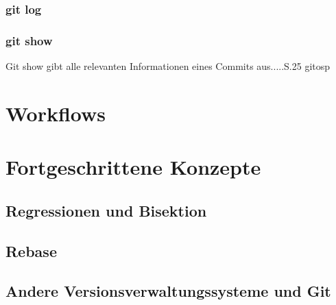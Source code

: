 \subsubsection{git log}\label{sec:gitlog}
\subsubsection{git show}\label{sec:gitshow}
Git show gibt alle relevanten Informationen eines Commits aus.....S.25 gitosp

\section{Workflows}
\label{sec:Workflows}
\section{Fortgeschrittene Konzepte}
\label{sec:FortgeschritteneKonzepte}
\subsection{Regressionen und Bisektion}\label{sec:bisec}
\subsection{Rebase}\label{sec:rebase}
\subsection{Andere Versionsverwaltungssysteme und Git}
\label{sec:AndereVersionsverwaltungssystemeundGit}

